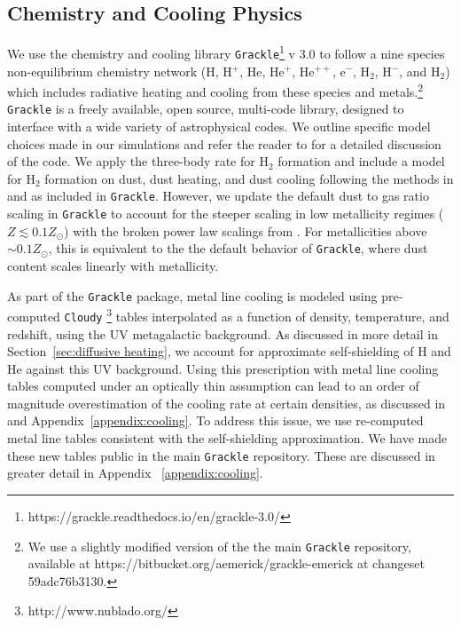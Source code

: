 \documentclass[twocolumn]{aastex61}
\begin{document}

\subsection{Chemistry and Cooling Physics}
\label{sec:chemistry}

We use the chemistry and cooling library \texttt{Grackle}\footnote{https://grackle.readthedocs.io/en/grackle-3.0/} v 3.0 to follow a nine species non-equilibrium chemistry network (H, H$^+$, He, He$^+$, He$^{++}$, e$^{-}$, H$_2$, H$^{-}$, and H$_{2}$) which includes radiative heating and cooling from these species and metals.\footnote{We use a slightly modified version of the the main \texttt{Grackle} repository, available at https://bitbucket.org/aemerick/grackle-emerick at changeset 59adc76b3130.} \texttt{Grackle} is a freely available, open source, multi-code library, designed to interface with a wide variety of astrophysical codes. We outline specific model choices made in our simulations and refer the reader to \citet{GrackleMethod} for a detailed discussion of the code. We apply the \citet{Glover2008} three-body rate for H$_{2}$ formation and include a model for H$_2$ formation on dust, dust heating, and dust cooling following the methods in \citet{2000ApJ...534..809O} and \citet{2005ApJ...626..627O} as included in \texttt{Grackle}. However, we update the default dust to gas ratio scaling in \texttt{Grackle} to account for the steeper scaling in low metallicity regimes ($Z \lesssim 0.1 Z_{\odot}$) with the broken power law scalings from \citet{Remy-Ruyer2014}. For metallicities above $\sim 0.1 Z_{\odot}$, this is equivalent to the the default behavior of \texttt{Grackle}, where dust content scales linearly with metallicity.

As part of the \texttt{Grackle} package, metal line cooling is modeled using pre-computed \texttt{Cloudy} \citep{Cloudy2013} \footnote{http://www.nublado.org/} tables interpolated as a function of density, temperature, and redshift, using the \citet{HM2012} UV metagalactic background. As discussed in more detail in Section~\ref{sec:diffusive heating}, we account for approximate self-shielding of H and He against this UV background. Using this prescription with metal line cooling tables computed under an optically thin assumption can lead to an order of magnitude overestimation of the cooling rate at certain densities, as discussed in \citet{Hu2017} and  Appendix~\ref{appendix:cooling}. To address this issue, we use re-computed metal line tables consistent with the self-shielding approximation.  We have made these new tables public in the main \texttt{Grackle} repository. These are discussed in greater detail in Appendix ~\ref{appendix:cooling}.
\end{document}
